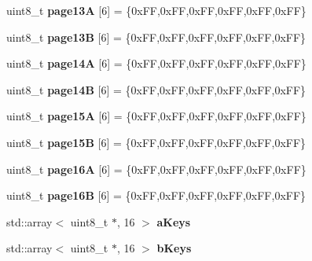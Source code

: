 \begin{DoxyCompactItemize}
\item 
\mbox{\label{structnfc_1_1cardKeys_a58d502be3466983195c3c707d9104cdc}} 
uint8\+\_\+t {\bfseries page13A} \mbox{[}6\mbox{]} = \{0x\+F\+F,0x\+F\+F,0x\+F\+F,0x\+F\+F,0x\+F\+F,0x\+F\+F\}
\item 
\mbox{\label{structnfc_1_1cardKeys_a040d592f3f701692c6b369a9b0d52677}} 
uint8\+\_\+t {\bfseries page13B} \mbox{[}6\mbox{]} = \{0x\+F\+F,0x\+F\+F,0x\+F\+F,0x\+F\+F,0x\+F\+F,0x\+F\+F\}
\item 
\mbox{\label{structnfc_1_1cardKeys_ad66c7fe7ad0467e025a3bc1a49cb7e75}} 
uint8\+\_\+t {\bfseries page14A} \mbox{[}6\mbox{]} = \{0x\+F\+F,0x\+F\+F,0x\+F\+F,0x\+F\+F,0x\+F\+F,0x\+F\+F\}
\item 
\mbox{\label{structnfc_1_1cardKeys_aa3cb3a2a60c987627253a3d40d6a64c4}} 
uint8\+\_\+t {\bfseries page14B} \mbox{[}6\mbox{]} = \{0x\+F\+F,0x\+F\+F,0x\+F\+F,0x\+F\+F,0x\+F\+F,0x\+F\+F\}
\item 
\mbox{\label{structnfc_1_1cardKeys_a9f6b2aa087f0bb48f064a08069c329f3}} 
uint8\+\_\+t {\bfseries page15A} \mbox{[}6\mbox{]} = \{0x\+F\+F,0x\+F\+F,0x\+F\+F,0x\+F\+F,0x\+F\+F,0x\+F\+F\}
\item 
\mbox{\label{structnfc_1_1cardKeys_abf11b530a904be3e40e4eafa043b1595}} 
uint8\+\_\+t {\bfseries page15B} \mbox{[}6\mbox{]} = \{0x\+F\+F,0x\+F\+F,0x\+F\+F,0x\+F\+F,0x\+F\+F,0x\+F\+F\}
\item 
\mbox{\label{structnfc_1_1cardKeys_a7e991ca1f9ecc2161ddc8c71e44ce74a}} 
uint8\+\_\+t {\bfseries page16A} \mbox{[}6\mbox{]} = \{0x\+F\+F,0x\+F\+F,0x\+F\+F,0x\+F\+F,0x\+F\+F,0x\+F\+F\}
\item 
\mbox{\label{structnfc_1_1cardKeys_a3c680368d1d87905041a0e706db314ee}} 
uint8\+\_\+t {\bfseries page16B} \mbox{[}6\mbox{]} = \{0x\+F\+F,0x\+F\+F,0x\+F\+F,0x\+F\+F,0x\+F\+F,0x\+F\+F\}
\item 
std\+::array$<$ uint8\+\_\+t $\ast$, 16 $>$ {\bfseries a\+Keys}
\item 
std\+::array$<$ uint8\+\_\+t $\ast$, 16 $>$ {\bfseries b\+Keys}
\end{DoxyCompactItemize}


